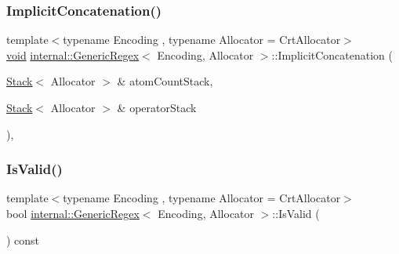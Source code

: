 \mbox{\label{classinternal_1_1GenericRegex_a3b6d21989c3e41e33f6d2a7897ffdd6b}} 
\subsubsection{\texorpdfstring{Implicit\+Concatenation()}{ImplicitConcatenation()}}
{\footnotesize\ttfamily template$<$typename Encoding , typename Allocator  = Crt\+Allocator$>$ \\
\hyperlink{imgui__impl__opengl3__loader_8h_ac668e7cffd9e2e9cfee428b9b2f34fa7}{void} \hyperlink{classinternal_1_1GenericRegex}{internal\+::\+Generic\+Regex}$<$ Encoding, Allocator $>$\+::Implicit\+Concatenation (\begin{DoxyParamCaption}\item[{\hyperlink{classinternal_1_1Stack}{Stack}$<$ Allocator $>$ \&}]{atom\+Count\+Stack,  }\item[{\hyperlink{classinternal_1_1Stack}{Stack}$<$ Allocator $>$ \&}]{operator\+Stack }\end{DoxyParamCaption})\hspace{0.3cm}{\ttfamily [inline]}, {\ttfamily [private]}}

\mbox{\label{classinternal_1_1GenericRegex_a34ddb18fa3a2c70203d0fb740443c2a8}} 
\subsubsection{\texorpdfstring{Is\+Valid()}{IsValid()}}
{\footnotesize\ttfamily template$<$typename Encoding , typename Allocator  = Crt\+Allocator$>$ \\
bool \hyperlink{classinternal_1_1GenericRegex}{internal\+::\+Generic\+Regex}$<$ Encoding, Allocator $>$\+::Is\+Valid (\begin{DoxyParamCaption}{ }\end{DoxyParamCaption}) const\hspace{0.3cm}{\ttfamily [inline]}}

\mbox{\label{classinternal_1_1GenericRegex_a064e15b8c9c222a07e143ec5847c6ec6}} 
